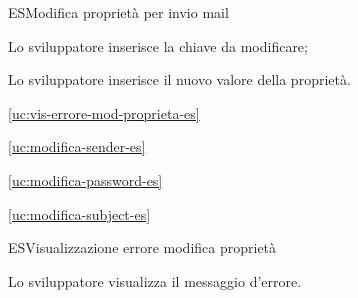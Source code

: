 \begin{usecase}{6}{ES}{Modifica proprietà per invio mail}



	\begin{ucscenarioprincipale}
		\item Lo sviluppatore inserisce la chiave da modificare;
		\item Lo sviluppatore inserisce il nuovo valore della proprietà.
	\end{ucscenarioprincipale}


	\begin{ucestensioni}
		\item \ref{uc:vis-errore-mod-proprieta-es}
	\end{ucestensioni}

	\begin{ucgeneralizzazioni}
		\item \ref{uc:modifica-sender-es}
		\item \ref{uc:modifica-password-es}
		\item \ref{uc:modifica-subject-es}
	\end{ucgeneralizzazioni}

	\label{uc:modifica-proprieta-es}
\end{usecase}

\begin{usecase}{7}{ES}{Visualizzazione errore modifica proprietà}



	\begin{ucscenarioprincipale}
		\item Lo sviluppatore visualizza il messaggio d'errore.
	\end{ucscenarioprincipale}


	\label{uc:vis-errore-mod-proprieta-es}
\end{usecase}

